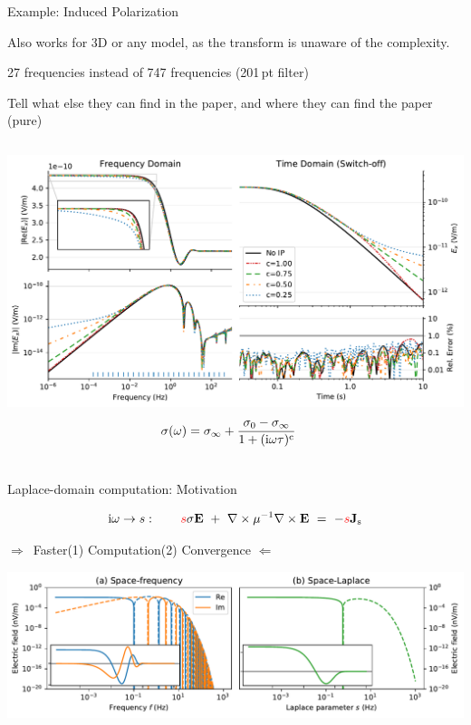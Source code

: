 \documentclass[xcolor=svgnames, usepdftitle=false, aspectratio=169]{beamer}
\newcommand{\bdra}{\ensuremath{\boldsymbol \Rightarrow }~}
\newcommand{\bdla}{\ensuremath{\boldsymbol \Leftarrow }~}
\newcommand{\mr}[1]{\mathrm{#1}}
\begin{document}
\begin{frame}
  {Example: Induced Polarization}

  Also works for 3D or any model, as the transform is unaware of the
  complexity.

  27 frequencies instead of 747 frequencies (201\,pt filter)

  Tell what else they can find in the paper, and where they can find the paper
  (pure)

  \begin{columns}
      \includegraphics[width=\linewidth]{11-cole-cole-model}
      \begin{equation}
       ~\hspace{-.5cm} \sigma(\omega) = \sigma_\infty + \frac{\sigma_0 - \sigma_\infty}{1 +
          (\rm{i}\omega\tau)^c}
          \nonumber
      \end{equation}
  \end{columns}

\end{frame}


\begin{frame}  %
  {Laplace-domain computation: Motivation}
  \centering
  \vspace{-.5cm}

  $$
    \mr{i}\omega \rightarrow s:
    \qquad
    \textcolor{red}{s} \sigma \mathbf{E} \ +\
    \nabla \times \mu^{-1} \nabla \times \mathbf{E}
    \ =\ -\textcolor{red}{s} \mathbf{J}_\mathrm{s}
  $$

  \bdra Faster\quad (1) Computation\quad (2) Convergence \quad \bdla\\
  \vspace{.5cm}

  \includegraphics[width=\textwidth]{motivationcomparison}

\end{frame}
\end{document}
